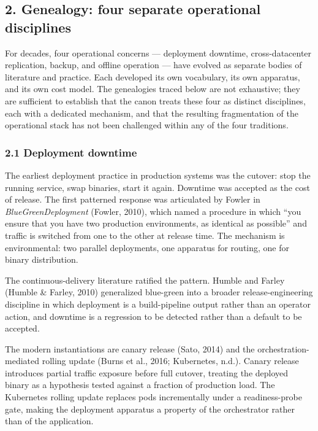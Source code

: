 \documentclass[
]{article}
\begin{document}
\subsection{2. Genealogy: four separate operational
disciplines}\label{genealogy-four-separate-operational-disciplines}

For decades, four operational concerns --- deployment downtime,
cross-datacenter replication, backup, and offline operation --- have
evolved as separate bodies of literature and practice. Each developed
its own vocabulary, its own apparatus, and its own cost model. The
genealogies traced below are not exhaustive; they are sufficient to
establish that the canon treats these four as distinct disciplines, each
with a dedicated mechanism, and that the resulting fragmentation of the
operational stack has not been challenged within any of the four
traditions.

\subsubsection{2.1 Deployment downtime}\label{deployment-downtime}

The earliest deployment practice in production systems was the cutover:
stop the running service, swap binaries, start it again. Downtime was
accepted as the cost of release. The first patterned response was
articulated by Fowler in \emph{BlueGreenDeployment} (Fowler, 2010),
which named a procedure in which ``you ensure that you have two
production environments, as identical as possible'' and traffic is
switched from one to the other at release time. The mechanism is
environmental: two parallel deployments, one apparatus for routing, one
for binary distribution.

The continuous-delivery literature ratified the pattern. Humble and
Farley (Humble \& Farley, 2010) generalized blue-green into a broader
release-engineering discipline in which deployment is a build-pipeline
output rather than an operator action, and downtime is a regression to
be detected rather than a default to be accepted.

The modern instantiations are canary release (Sato, 2014) and the
orchestration-mediated rolling update (Burns et al., 2016; Kubernetes,
n.d.). Canary release introduces partial traffic exposure before full
cutover, treating the deployed binary as a hypothesis tested against a
fraction of production load. The Kubernetes rolling update replaces pods
incrementally under a readiness-probe gate, making the deployment
apparatus a property of the orchestrator rather than of the application.
\end{document}
